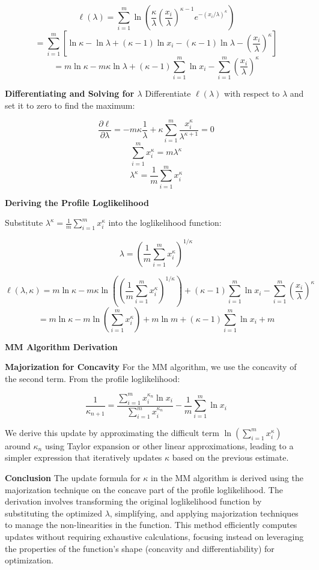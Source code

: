 \documentclass[8pt]{article}
\begin{document}
\[
\ell(\lambda) = \sum_{i=1}^m \ln \left( \frac{\kappa}{\lambda} \left( \frac{x_i}{\lambda} \right)^{\kappa - 1} e^{-(x_i / \lambda)^\kappa} \right)
\]
\[
= \sum_{i=1}^m \left[ \ln \kappa - \ln \lambda + (\kappa - 1) \ln x_i - (\kappa - 1) \ln \lambda - \left(\frac{x_i}{\lambda}\right)^\kappa \right]
\]
\[
= m \ln \kappa - m \kappa \ln \lambda + (\kappa - 1) \sum_{i=1}^m \ln x_i - \sum_{i=1}^m \left(\frac{x_i}{\lambda}\right)^\kappa
\]

\textbf{Differentiating and Solving for \(\lambda\)}
Differentiate \(\ell(\lambda)\) with respect to \(\lambda\) and set it to zero to find the maximum:

\[
\frac{\partial \ell}{\partial \lambda} = -m \kappa \frac{1}{\lambda} + \kappa \sum_{i=1}^m \frac{x_i^\kappa}{\lambda^{\kappa + 1}} = 0
\]
\[
\sum_{i=1}^m x_i^\kappa = m \lambda^\kappa
\]
\[
\lambda^\kappa = \frac{1}{m} \sum_{i=1}^m x_i^\kappa
\]

\textbf{Deriving the Profile Loglikelihood}

Substitute \(\lambda^\kappa = \frac{1}{m} \sum_{i=1}^m x_i^\kappa\) into the loglikelihood function:

\[
\lambda = \left(\frac{1}{m} \sum_{i=1}^m x_i^\kappa\right)^{1/\kappa}
\]

\[
\ell(\lambda, \kappa) = m \ln \kappa - m \kappa \ln \left( \left(\frac{1}{m} \sum_{i=1}^m x_i^\kappa\right)^{1/\kappa} \right) + (\kappa - 1) \sum_{i=1}^m \ln x_i - \sum_{i=1}^m \left(\frac{x_i}{\lambda}\right)^\kappa
\]
\[
= m \ln \kappa - m \ln \left( \sum_{i=1}^m x_i^\kappa \right) + m \ln m + (\kappa - 1) \sum_{i=1}^m \ln x_i + m
\]

\textbf{MM Algorithm Derivation}

\textbf{Majorization for Concavity}
For the MM algorithm, we use the concavity of the second term. From the profile loglikelihood:

\[
\frac{1}{\kappa_{n+1}} = \frac{\sum_{i=1}^m x_i^{\kappa_n} \ln x_i}{\sum_{i=1}^m x_i^{\kappa_n}} - \frac{1}{m} \sum_{i=1}^m \ln x_i
\]

We derive this update by approximating the difficult term \(\ln \left(\sum_{i=1}^m x_i^\kappa\right)\) around \(\kappa_n\) using Taylor expansion or other linear approximations, leading to a simpler expression that iteratively updates \(\kappa\) based on the previous estimate.

\textbf{Conclusion}
The update formula for \(\kappa\) in the MM algorithm is derived using the majorization technique on the concave part of the profile loglikelihood. The derivation involves transforming the original loglikelihood function by substituting the optimized \(\lambda\), simplifying, and applying majorization techniques to manage the non-linearities in the function. This method efficiently computes updates without requiring exhaustive calculations, focusing instead on leveraging the properties of the function's shape (concavity and differentiability) for optimization.
\end{document}
